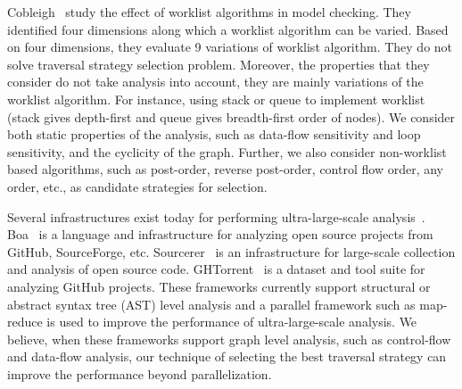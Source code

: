 Cobleigh\etal~\cite{cobleigh-etal} study the effect of worklist algorithms in
model checking. They identified four dimensions along which a worklist algorithm
can be varied. Based on four dimensions, they evaluate 9 variations of worklist
algorithm. They do not solve traversal strategy selection problem. Moreover, the
properties that they consider do not take analysis into account, they are mainly
variations of the worklist algorithm. For instance, using stack or queue to
implement worklist (stack gives depth-first and queue gives breadth-first order
of nodes).
We consider both static properties of the analysis, such as data-flow
sensitivity and loop sensitivity, and the cyclicity of the graph. Further, we
also consider non-worklist based algorithms, such as post-order, reverse
post-order, control flow order, any order, etc., as candidate strategies
for selection.

Several infrastructures exist today for performing ultra-large-scale
analysis~\cite{dyer2013boa,Bajracharya-etal-04,Gousi13}. Boa~\cite{dyer2013boa}
is a language and infrastructure for analyzing open source projects from GitHub,
SourceForge, etc. Sourcerer~\cite{Bajracharya-etal-04} is an infrastructure for
large-scale collection and analysis of open source code.
GHTorrent~\cite{Gousi13} is a dataset and tool suite for analyzing GitHub
projects. These frameworks currently support structural or abstract syntax tree
(AST) level analysis and a parallel framework such as map-reduce is used to
improve the performance of ultra-large-scale analysis. We believe, when these frameworks
support graph level analysis, such as control-flow and data-flow analysis, our
technique of selecting the best traversal strategy can improve the performance
beyond parallelization.

